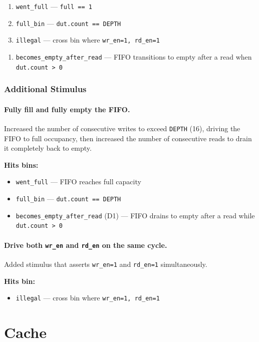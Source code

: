 \documentclass[11pt]{article}
\begin{document}
\begin{enumerate}
  \item \texttt{went\_full} --- \texttt{full == 1}
  \item \texttt{full\_bin} --- \texttt{dut.count == DEPTH}
  \item \texttt{illegal} --- cross bin where \texttt{wr\_en=1, rd\_en=1}
\end{enumerate}
\begin{enumerate}[label={D1.}]
  \item \texttt{becomes\_empty\_after\_read} --- FIFO transitions to empty after a read when \texttt{dut.count > 0}
\end{enumerate}

\subsubsection*{Additional Stimulus}

\paragraph*{Fully fill and fully empty the FIFO.}
Increased the number of consecutive writes to exceed \texttt{DEPTH} (16), driving the FIFO to full occupancy, then increased the number of consecutive reads to drain it completely back to empty.

\textbf{Hits bins:}
\begin{itemize}
  \item \texttt{went\_full} --- FIFO reaches full capacity
  \item \texttt{full\_bin} --- \texttt{dut.count == DEPTH}
  \item \texttt{becomes\_empty\_after\_read} (D1) --- FIFO drains to empty after a read while \texttt{dut.count > 0}
\end{itemize}

\paragraph*{Drive both \texttt{wr\_en} and \texttt{rd\_en} on the same cycle.}
Added stimulus that asserts \texttt{wr\_en=1} and \texttt{rd\_en=1} simultaneously.

\textbf{Hits bin:}
\begin{itemize}
  \item \texttt{illegal} --- cross bin where \texttt{wr\_en=1, rd\_en=1}
\end{itemize}

\section*{Cache}
\end{document}
